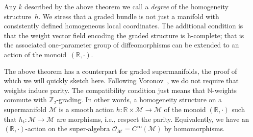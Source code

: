 \documentclass[pdftex]{sigma}
\numberwithin{equation}{section}
\begin{document}
Any $k$ described by the above theorem we call a \emph{degree} of the homogeneity structure~$h$. We stress that  a graded bundle is not just a manifold with consistently def\/ined homogeneous local coordinates. The additional condition is that the weight vector f\/ield encoding the graded structure is  h-complete; that is the associated one-parameter group of dif\/feomorphisms  can be extended to an action of the monoid~$(\mathbb{R}, \cdot)$.

\begin{Remark}
The above theorem has a counterpart for graded supermanifolds, the proof of which we will quickly sketch here. Following Voronov~\cite{Voronov:2001qf}, we do not require that weights induce parity. The compatibility condition just means that $\mathbb{N}$-weights commute with $\mathbb{Z}_2$-grading. In other words, a homogeneity structure on a supermanifold ${\mathcal M}$ is a smooth action $h\colon {\mathbb R}\times{\mathcal M}\to{\mathcal M}$ of the monoid $({\mathbb R},\cdot)$ such that $h_t\colon {\mathcal M}\to{\mathcal M}$ are morphisms, i.e., respect the parity. Equivalently, we have an $({\mathbb R},\cdot)$-action on
the super-algebra ${\mathcal O}_{\mathcal M}=C^\infty({\mathcal M})$ by homomorphisms.



\end{Remark}
\end{document}
